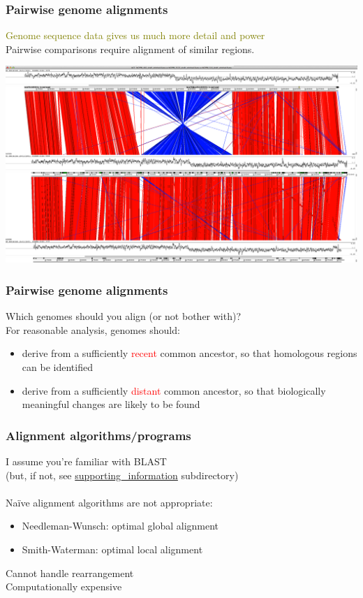 
%
\begin{frame}
  \frametitle{Pairwise genome alignments}
  \textcolor{olive}{Genome sequence data gives us much more detail and power} \\
  Pairwise comparisons require alignment of similar regions.
  \begin{center}
    \includegraphics[width=\textwidth]{images/pairwise_genome_alignment}
  \end{center}  
\end{frame}

%
\begin{frame}
  \frametitle{Pairwise genome alignments}
  \textcolor{hutton_green}{Which genomes should you align (or not bother with)?} \\
  \textcolor{RawSienna}{For reasonable analysis, genomes should}:
  \begin{itemize}
    \item derive from a sufficiently \textcolor{red}{recent} common ancestor, so that \textcolor{hutton_purple}{homologous regions can be identified}
    \item derive from a sufficiently \textcolor{red}{distant} common ancestor, so that \textcolor{hutton_purple}{biologically meaningful changes are likely to be found}
  \end{itemize}
\end{frame}

%
\begin{frame}
  \frametitle{Alignment algorithms/programs}
  \textcolor{hutton_green}{I assume you're familiar with BLAST} \\
  (but, if not, see \url{supporting_information} subdirectory) \\~\\
  \textcolor{RawSienna}{Na\"{i}ve alignment algorithms are not appropriate}:
  \begin{itemize}
    \item Needleman-Wunsch: optimal global alignment
    \item Smith-Waterman: optimal local alignment
  \end{itemize}
  \textcolor{hutton_blue}{Cannot handle rearrangement} \\
  \textcolor{hutton_purple}{Computationally expensive}  
\end{frame}


